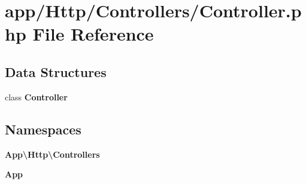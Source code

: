 \section{app/\+Http/\+Controllers/\+Controller.php File Reference}
\label{app_2_http_2_controllers_2_controller_8php}
\subsection*{Data Structures}
\begin{DoxyCompactItemize}
\item 
class {\bf Controller}
\end{DoxyCompactItemize}
\subsection*{Namespaces}
\begin{DoxyCompactItemize}
\item 
 {\bf App\textbackslash{}\+Http\textbackslash{}\+Controllers}
\item 
 {\bf App}
\end{DoxyCompactItemize}
